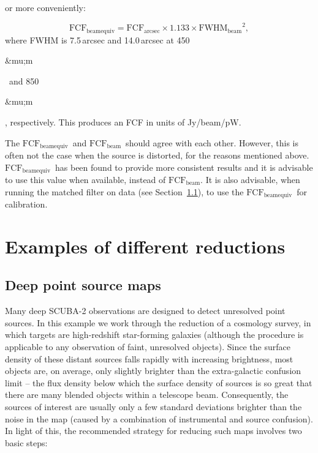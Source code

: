 \documentclass[twoside,11pt]{article}
\newcommand{\micron}{\mbox{\,${\umu}$m}}            %
\newcommand{\xlabel}[1]{}
\renewcommand{\_}{\texttt{\symbol{95}}}
\newcommand{\fcfbe}{$\mathrm{FCF_{beamequiv}}$}
\newcommand{\fcfb}{$\mathrm{FCF_{beam}}$}
\renewcommand{\micron}{\begin{rawhtml}&mu;m\end{rawhtml}}
\begin{document}
\begin{itemize}
 or more conveniently:

\begin{equation}
\mathrm{FCF_{beamequiv}} = \mathrm{FCF_{arcsec}} \times 1.133 \times
\mathrm{FWHM_{beam}}^2,
\end{equation}
where FWHM is 7.5\,arcsec and 14.0\,arcsec at 450\micron\ and
850\micron, respectively. This produces an FCF in units of
Jy/beam/pW.

The \fcfbe\ and \fcfb\ should agree
with each other. However, this is often not the case when the source
is distorted, for the reasons mentioned
above. \fcfbe\ has been found to provide more
consistent results and it is advisable to use this value when
available, instead of \fcfb. It is also advisable,
when running the matched filter on data (see
Section~\ref{sec:cosmology}), to use the \fcfbe\
for calibration.

\end{itemize}


\section{\xlabel{Examples}Examples of different reductions}
\label{sec:eg}

\subsection{\xlabel{Cosmology}Deep point source maps}
\label{sec:cosmology}

Many deep SCUBA-2 observations are designed to detect unresolved
point sources. In this example we work through the reduction of a
cosmology survey, in which targets are high-redshift star-forming
galaxies (although the procedure is applicable to any observation of
faint, unresolved objects).  Since the surface density of these
distant sources falls rapidly with increasing brightness, most objects
are, on average, only slightly brighter than the extra-galactic
confusion limit -- the flux density below which the surface density of
sources is so great that there are many blended objects within a
telescope beam. Consequently, the sources of interest are usually only
a few standard deviations brighter than the noise in the map (caused
by a combination of instrumental and source confusion). In light of
this, the recommended strategy for reducing such maps involves two
basic steps:
\end{document}
